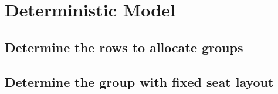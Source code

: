\section{Deterministic Model}


\subsection*{Determine the rows to allocate groups}


\subsection*{Determine the group with fixed seat layout}
